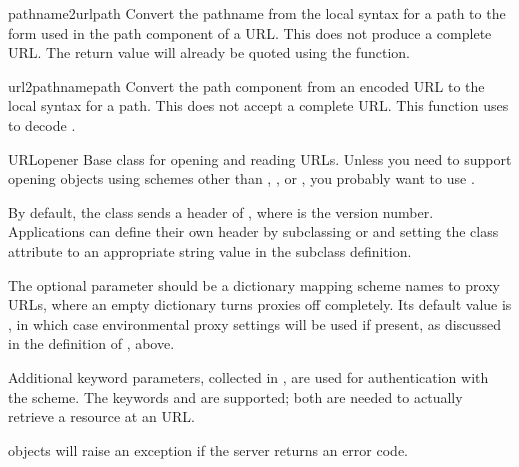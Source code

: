 \begin{funcdesc}{pathname2url}{path}
Convert the pathname  from the local syntax for a path to
the form used in the path component of a URL.  This does not produce a
complete URL.  The return value will already be quoted using the
 function.
\end{funcdesc}

\begin{funcdesc}{url2pathname}{path}
Convert the path component  from an encoded URL to the local
syntax for a path.  This does not accept a complete URL.  This
function uses  to decode .
\end{funcdesc}

\begin{classdesc}{URLopener}{}
Base class for opening and reading URLs.  Unless you need to support
opening objects using schemes other than , ,
 or , you probably want to use
.

By default, the  class sends a
 header of , where
 is the  version number.  Applications can
define their own  header by subclassing
 or  and setting the class
attribute  to an appropriate string value in the
subclass definition.

The optional  parameter should be a dictionary mapping
scheme names to proxy URLs, where an empty dictionary turns proxies
off completely.  Its default value is , in which case
environmental proxy settings will be used if present, as discussed in
the definition of , above.

Additional keyword parameters, collected in , are used for
authentication with the  scheme.  The keywords
 and  are supported; both are needed to
actually retrieve a resource at an  URL.

 objects will raise an  exception
if the server returns an error code.
\end{classdesc}


